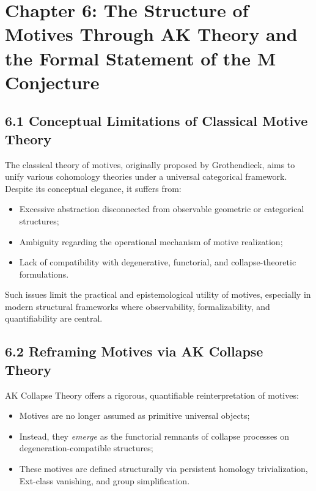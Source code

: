 \documentclass[11pt]{article}
\begin{document}
\FloatBarrier




\section{Chapter 6: The Structure of Motives Through AK Theory and the Formal Statement of the M Conjecture}

\subsection{6.1 Conceptual Limitations of Classical Motive Theory}

The classical theory of motives, originally proposed by Grothendieck, aims to unify various cohomology theories under a universal categorical framework. Despite its conceptual elegance, it suffers from:

\begin{itemize}
    \item Excessive abstraction disconnected from observable geometric or categorical structures;
    \item Ambiguity regarding the operational mechanism of motive realization;
    \item Lack of compatibility with degenerative, functorial, and collapse-theoretic formulations.
\end{itemize}

Such issues limit the practical and epistemological utility of motives, especially in modern structural frameworks where observability, formalizability, and quantifiability are central.

\subsection{6.2 Reframing Motives via AK Collapse Theory}

AK Collapse Theory offers a rigorous, quantifiable reinterpretation of motives:

\begin{itemize}
    \item Motives are no longer assumed as primitive universal objects;
    \item Instead, they \emph{emerge} as the functorial remnants of collapse processes on degeneration-compatible structures;
    \item These motives are defined structurally via persistent homology trivialization, Ext-class vanishing, and group simplification.
\end{itemize}
\end{document}
